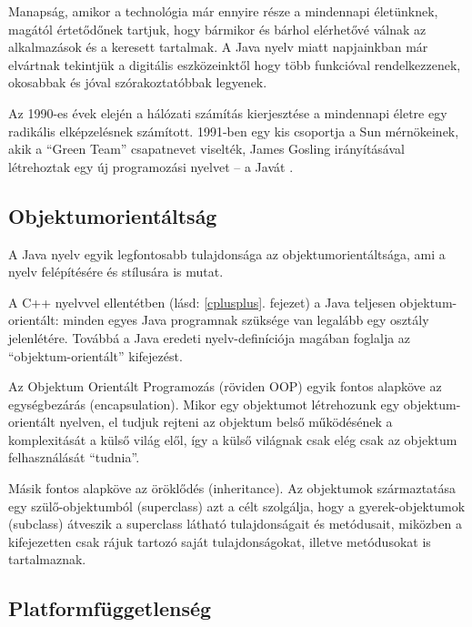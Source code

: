 \documentclass[a4paper,12pt]{report}
\begin{document}
Manapság, amikor a technológia már ennyire része a mindennapi életünknek, magától értetődőnek tartjuk, hogy bármikor és bárhol elérhetővé válnak az alkalmazások és a keresett tartalmak. A Java nyelv miatt napjainkban már elvártnak tekintjük a digitális eszközeinktől hogy több funkcióval rendelkezzenek, okosabbak és jóval szórakoztatóbbak legyenek.

\vspace{2mm}
Az 1990-es évek elején a hálózati számítás kierjesztése a mindennapi életre egy radikális elképzelésnek számított. 1991-ben egy kis csoportja a Sun mérnökeinek, akik a ``Green Team'' csapatnevet viselték, James Gosling irányításával létrehoztak egy új programozási nyelvet -- a Javát \cite{javahistory}.

\subsection{Objektumorientáltság}
\label{oo}

A Java nyelv egyik legfontosabb tulajdonsága az objektumorientáltsága, ami a nyelv felépítésére és stílusára is mutat. 

\vspace{2mm}
A C++ nyelvvel ellentétben (lásd: \ref{cplusplus}. fejezet) a Java teljesen objektum-orientált: minden egyes Java programnak szüksége van legalább egy osztály jelenlétére. Továbbá a Java eredeti nyelv-definíciója magában foglalja az ``objektum-orientált'' kifejezést.

\vspace{2mm}
Az Objektum Orientált Programozás (röviden OOP) egyik fontos alapköve az egységbezárás (encapsulation). Mikor egy objektumot létrehozunk egy objektum-orientált nyelven, el tudjuk rejteni az objektum belső működésének a komplexitását a külső világ elől, így a külső világnak csak elég csak az objektum felhasználását ``tudnia''.

\vspace{2mm}
Másik fontos alapköve az öröklődés (inheritance). Az objektumok származtatása egy szülő-objektumból (superclass) azt a célt szolgálja, hogy a gyerek-objektumok (subclass) átveszik a superclass látható tulajdonságait és metódusait, miközben a kifejezetten csak rájuk tartozó saját tulajdonságokat, illetve metódusokat is tartalmaznak.

\subsection{Platformfüggetlenség}
\label{platformfugg}
\end{document}
